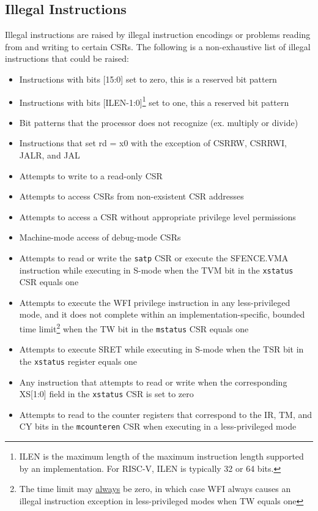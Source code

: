 \documentclass[12pt]{article}
\begin{document}
\subsection{Illegal Instructions}
Illegal instructions are raised by illegal instruction encodings or problems reading from and writing to certain CSRs. The following is a non-exhaustive list of illegal instructions that could be raised:
\begin{itemize}
    \item Instructions with bits [15:0] set to zero, this is a reserved bit pattern
    \item Instructions with bits [ILEN-1:0]\footnote[2]{ILEN is the maximum length of the maximum instruction length supported by an implementation. For RISC-V, ILEN is typically 32 or 64 bits.} set to one, this a reserved bit pattern 
    \item Bit patterns that the processor does not recognize (ex. multiply or divide)
    \item Instructions that set rd = x0 with the exception of CSRRW, CSRRWI, JALR, and JAL
    \item Attempts to write to a read-only CSR 
    \item Attempts to access CSRs from non-exsistent CSR addresses
    \item Attempts to access a CSR without appropriate privilege level permissions 
    \item Machine-mode access of debug-mode CSRs
    \item Attempts to read or write the {\tt{satp}} CSR or execute the SFENCE.VMA instruction while executing in S-mode when the TVM bit in the {\tt{xstatus}} CSR equals one
    \item Attempts to execute the WFI privilege instruction in any less-privileged mode, and it does not complete within an implementation-specific, bounded time limit\footnote[3]{The time limit may \underline{always} be zero, in which case WFI always causes an illegal instruction exception in less-privileged modes when TW equals one} when the TW bit in the {\tt{mstatus}} CSR equals one
    \item Attempts to execute SRET while executing in S-mode when the TSR bit in the {\tt{xstatus}} register equals one
    \item Any instruction that attempts to read or write when the corresponding XS[1:0] field in the {\tt{xstatus}} CSR is set to zero
    \item Attempts to read to the counter registers that correspond to the IR, TM, and CY bits in the {\tt{mcounteren}} CSR when executing in a less-privileged mode 
\end{itemize}
\end{document}
